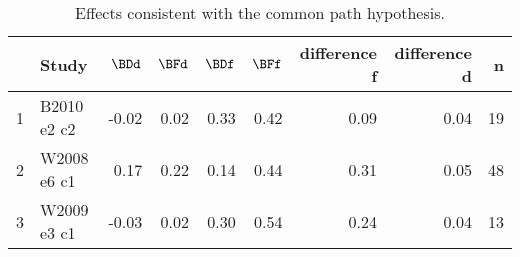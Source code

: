 \begin{table}[ht]
\centering
\begin{tabular}{llrrrrrrr}
  \hline
 & Study & $\BDd$ & $\BFd$ & $\BDf$ & $\BFf$ & difference f & difference d & n \\ 
  \hline
1 & B2010   e2 c2 & -0.02 & 0.02 & 0.33 & 0.42 & 0.09 & 0.04 &  19 \\ 
  2 & W2008   e6 c1 & 0.17 & 0.22 & 0.14 & 0.44 & 0.31 & 0.05 &  48 \\ 
  3 & W2009   e3 c1 & -0.03 & 0.02 & 0.30 & 0.54 & 0.24 & 0.04 &  13 \\ 
   \hline
\end{tabular}
\caption{Effects consistent with the common path hypothesis.} 
\label{tab:consistentEffects}
\end{table}

